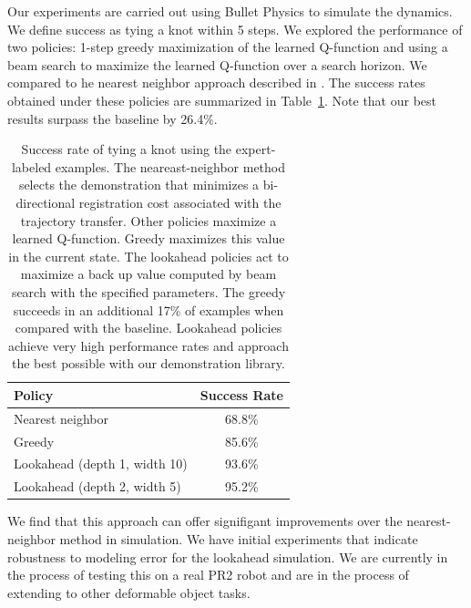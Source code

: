\documentclass[conference]{IEEEtran}
\begin{document}
Our experiments are carried out using Bullet Physics to simulate the
dynamics. We define success as tying a knot within 5 steps. We
explored the performance of two policies: 1-step greedy maximization
of the learned Q-function and using a beam search to maximize the
learned Q-function over a search horizon. We compared to he nearest
neighbor approach described in \citet{Schulmanetal_ISRR2013}.  The
success rates obtained under these policies are summarized in
Table~\ref{table:performance}. Note that our best results surpass the
baseline by 26.4\%.
\begin{table}
  \centering
  \normalsize
  \begin{tabular}{lc}
    \toprule
      Policy & Success Rate\\
    \midrule
      Nearest neighbor \cite{Schulmanetal_ISRR2013} & 68.8\% \\
    \midrule
      Greedy & 85.6\% \\
      Lookahead (depth 1, width 10) & 93.6\% \\
      Lookahead (depth 2, width 5) & 95.2\% \\
    \bottomrule
  \end{tabular}
  \caption{Success rate of tying a knot using the expert-labeled
    examples. The neareast-neighbor method selects the demonstration
    that minimizes a bi-directional registration cost associated with
    the trajectory transfer.  Other policies maximize a learned
    Q-function. Greedy maximizes this value in the current state. The
    lookahead policies act to maximize a back up value computed by
    beam search with the specified parameters. The greedy succeeds in
    an additional 17\% of examples when compared with the
    baseline. Lookahead policies achieve very high performance rates
    and approach the best possible with our demonstration library.}
  \label{table:performance}
\end{table}

We find that this approach can offer signifigant improvements over the
nearest-neighbor method in simulation. We have initial experiments
that indicate robustness to modeling error for the lookahead
simulation. We are currently in the process of testing this on a real
PR2 robot and are in the process of extending to other deformable
object tasks. 

\maketitle



\footnotesize

\end{document}
